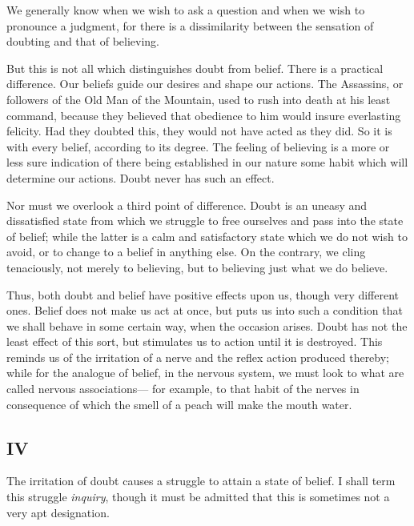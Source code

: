 We generally know when we wish to ask a question and when we wish to pronounce a judgment, for there is a dissimilarity between the sensation of doubting and that of believing.

But this is not all which distinguishes doubt from belief. There is a practical difference. Our beliefs guide our desires and shape our actions. The Assassins, or followers of the Old Man of the Mountain, used to rush into death at his least command, because they believed that obedience to him would insure everlasting felicity. Had they doubted this, they would not have acted as they did. So it is with every belief, according to its degree. The feeling of believing is a more or less sure indication of there being established in our nature some habit which will determine our actions. Doubt never has such an effect.

Nor must we overlook a third point of difference. Doubt is an uneasy and dissatisfied state from which we struggle to free ourselves and pass into the state of belief; while the latter is a calm and satisfactory state which we do not wish to avoid, or to change to a belief in anything else. On the contrary, we cling tenaciously, not merely to believing, but to believing just what we do believe.


Thus, both doubt and belief have positive effects upon us, though very different ones. Belief does not make us act at once, but puts us into such a condition that we shall behave in some certain way, when the occasion arises. Doubt has not the least effect of this sort, but stimulates us to action until it is destroyed. This reminds us of the irritation of a nerve and the reflex action produced thereby; while for the analogue of belief, in the nervous system, we must look to what are called nervous associations--- for example, to that habit of the nerves in consequence of which the smell of a peach will make the mouth water.

\subsection*{IV}

The irritation of doubt causes a struggle to attain a state of belief. I shall term this struggle \emph{inquiry}, though it must be admitted that this is sometimes not a very apt designation.


